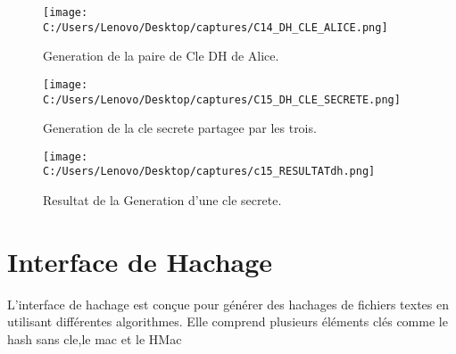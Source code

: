 \documentclass[a4paper,12pt]{report}
\begin{document}
 \begin{figure}[h!]
 	\centering
 	\texttt{[image: C:/Users/Lenovo/Desktop/captures/C14\_DH\_CLE\_ALICE.png]}
 	\caption{Generation de la paire de Cle DH de Alice.}
 \end{figure}
 
 \begin{figure}[h!]
 	\centering
 	\texttt{[image: C:/Users/Lenovo/Desktop/captures/C15\_DH\_CLE\_SECRETE.png]}
 	\caption{Generation de la cle secrete partagee par les trois.}
 \end{figure}
 
  \begin{figure}[h!]
 	\centering
 	\texttt{[image: C:/Users/Lenovo/Desktop/captures/c15\_RESULTATdh.png]}
 	\caption{Resultat de la Generation d'une cle secrete.}
 \end{figure}
 
 \clearpage
 
 \section{Interface de Hachage}
 
 L'interface de hachage est conçue pour   générer des hachages de fichiers textes en utilisant différentes algorithmes. Elle comprend plusieurs éléments clés comme le hash sans cle,le mac et le HMac
 
\end{document}
